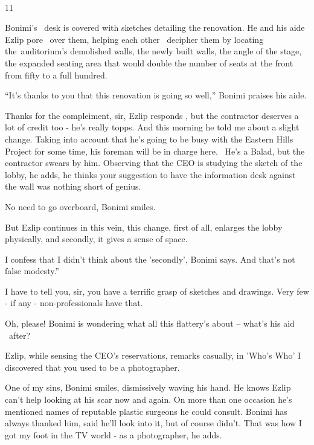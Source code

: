 \documentclass[12pt]{book}
\begin{document}
~

11

Bonimi's ~desk is covered{ }with sketches detailing the renovation. He and his aide Ezlip pore \ over
them, helping each other ~decipher them by locating the~auditorium's demolished walls, the newly built walls, the angle
of the stage, the expanded seating area that would double the number of seats at the front from fifty to a
full{ }hundred.~

{}``It's thanks to you that this renovation is going so well,'' Bonimi{ }praises his aide.

{\textquotedbl}Thanks for the compleiment, sir,{\textquotedbl} Ezlip responds , {\textquotedbl}but the contractor
deserves a lot of credit too - he's really topps. And this morning he told me about a slight change. Taking into
account that he's going to be busy with the Eastern Hills Project for some time, his foreman will be in charge here.
~He's a Balad, but the contractor swears{ }by him.{\textquotedbl} Observing that the CEO is studying the
sketch of the lobby, he adds, {\textquotedbl}he thinks your suggestion to{ }have the information desk
against the wall was nothing short of genius.{\textquotedbl}

{\textquotedbl}No need to go overboard,{\textquotedbl} Bonimi smiles.

But Ezlip continues in this vein, {\textquotedbl}this change, first of all, enlarges the lobby physically, and secondly,
it gives a sense of space.{\textquotedbl}

{\textquotedbl}I confess that I didn't think about the 'secondly',{\textquotedbl} Bonimi says. {\textquotedbl}And that's
not false modesty.''

{\textquotedbl}I have to tell you, sir, you have a terrific grasp of sketches and drawings. Very few - if any -
non-professionals have that.{\textquotedbl}

{\textquotedbl}Oh, please!{\textquotedbl} Bonimi is wondering what all this flattery's about -- what's his aid \ after?

Ezlip, while sensing the CEO's reservations, remarks casually, {\textquotedbl}in 'Who's Who' I discovered that you used
to be a photographer.{\textquotedbl}

{\textquotedbl}One of my sins,{\textquotedbl} Bonimi smiles, dismissively waving his hand. He knows Ezlip can't help
looking at his scar now and again. On more than one occasion he's mentioned names of reputable{ }plastic
surgeons he could consult. Bonimi has always thanked him, said he'll look into it, but of course didn't.
{\textquotedbl}That was how I got my foot in the TV world - as a photographer,{\textquotedbl} he adds.
\end{document}

